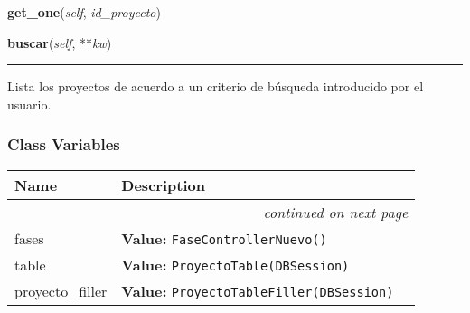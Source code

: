    \vspace{0.5ex}

\hspace{.8\funcindent}\begin{boxedminipage}{\funcwidth}

    \raggedright \textbf{get\_one}(\textit{self}, \textit{id\_proyecto})

\setlength{\parskip}{2ex}
\setlength{\parskip}{1ex}
    \end{boxedminipage}

    \label{saip:controllers:proyecto_controller_2:ProyectoControllerNuevo:buscar}

    \vspace{0.5ex}

\hspace{.8\funcindent}\begin{boxedminipage}{\funcwidth}

    \raggedright \textbf{buscar}(\textit{self}, **\textit{kw})

    \vspace{-1.5ex}

    \rule{\textwidth}{0.5\fboxrule}
\setlength{\parskip}{2ex}
    Lista los proyectos de acuerdo a un criterio de búsqueda introducido 
    por el usuario.

\setlength{\parskip}{1ex}
    \end{boxedminipage}



  \subsubsection{Class Variables}

    \vspace{-1cm}
\hspace{\varindent}\begin{longtable}{|p{\varnamewidth}|p{\vardescrwidth}|l}
\cline{1-2}
\cline{1-2} \centering \textbf{Name} & \centering \textbf{Description}& \\
\cline{1-2}
\endhead\cline{1-2}\multicolumn{3}{r}{\small\textit{continued on next page}}\\\endfoot\cline{1-2}
\endlastfoot\raggedright f\-a\-s\-e\-s\- & \raggedright \textbf{Value:} 
{\tt FaseControllerNuevo()}&\\
\cline{1-2}
\raggedright t\-a\-b\-l\-e\- & \raggedright \textbf{Value:} 
{\tt ProyectoTable(DBSession)}&\\
\cline{1-2}
\raggedright p\-r\-o\-y\-e\-c\-t\-o\-\_\-f\-i\-l\-l\-e\-r\- & \raggedright \textbf{Value:} 
{\tt ProyectoTableFiller(DBSession)}&\\
\cline{1-2}
\end{longtable}

